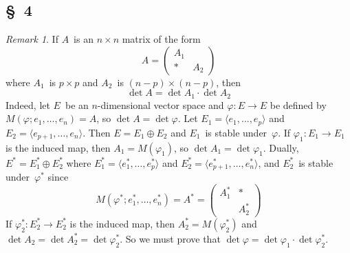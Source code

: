 \documentclass[letterpaper,12pt]{article}
\newcommand{\dsum}{\oplus}
\newcommand{\mult}{\cdot}
\newcommand{\gen}[1]{\langle#1\rangle}
\theoremstyle{definition}
\theoremstyle{remark}
\newtheorem*{rmk}{Remark}
\begin{document}
\subsection*{\S~4}
\begin{rmk}
If \(A\)~is an \(n\times n\) matrix of the form
\[A=\begin{pmatrix}
A_1&\\
*&A_2
\end{pmatrix}\]
where \(A_1\)~is \(p\times p\) and \(A_2\)~is \((n-p)\times(n-p)\), then
\[\det A=\det A_1\mult\det A_2\tag{1}\]
Indeed, let \(E\)~be an \(n\)-dimensional vector space and \(\varphi:E\to E\) be defined by \(M(\varphi;e_1,\ldots,e_n)=A\), so \(\det A=\det\varphi\). Let \(E_1=\gen{e_1,\ldots,e_p}\) and \(E_2=\gen{e_{p+1},\ldots,e_n}\). Then \(E=E_1\dsum E_2\) and \(E_1\)~is stable under~\(\varphi\). If \(\varphi_1:E_1\to E_1\) is the induced map, then \(A_1=M(\varphi_1)\), so \(\det A_1=\det\varphi_1\). Dually, \(E^*=E_1^*\dsum E_2^*\) where \(E_1^*=\gen{e_1^*,\ldots,e_p^*}\) and \(E_2^*=\gen{e_{p+1}^*,\ldots,e_n^*}\), and \(E_2^*\)~is stable under~\(\varphi^*\) since
\[M(\varphi^*;e_1^*,\ldots,e_n^*)=A^*=\begin{pmatrix}
A_1^*&*\\
&A_2^*
\end{pmatrix}\]
If \(\varphi_2^*:E_2^*\to E_2^*\) is the induced map, then \(A_2^*=M(\varphi_2^*)\) and \(\det A_2=\det A_2^*=\det\varphi_2^*\). So we must prove that \(\det\varphi=\det\varphi_1\mult\det\varphi_2^*\).


\end{rmk}
\end{document}
